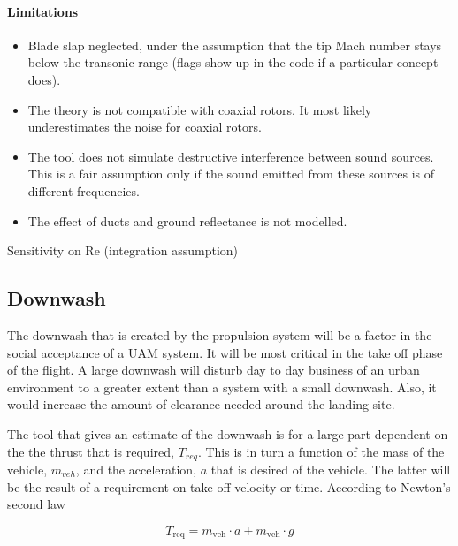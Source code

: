 \paragraph{Limitations}

\begin{itemize}
    \item Blade slap neglected, under the assumption that the tip Mach number stays below the transonic range (flags show up in the code if a particular concept does).
    \item The theory is not compatible with coaxial rotors. It most likely underestimates the noise for coaxial rotors. 
    \item The tool does not simulate destructive interference between sound sources. This is a fair assumption only if the sound emitted from these sources is of different frequencies.
    \item The effect of ducts and ground reflectance is not modelled.
\end{itemize}
 



Sensitivity on Re (integration assumption)











\subsection{Downwash}
The downwash that is created by the propulsion system will be a factor in the social acceptance of a UAM system. It will be most critical in the take off phase of the flight. A large downwash will disturb day to day business of an urban environment to a greater extent than a system with a small downwash. Also, it would increase the amount of clearance needed around the landing site. 

The tool that gives an estimate of the downwash is for a large part dependent on the the thrust that is required, $T_{req}$. This is in turn a function of the mass of the vehicle, $m_{veh}$, and the acceleration, $a$ that is desired of the vehicle. The latter will be the result of a requirement on take-off velocity or time. According to Newton's second law 

\begin{equation}
\label{downwasheq}
    T_\text{req} = m_\text{veh} \cdot a + m_\text{veh} \cdot g 
\end{equation}

